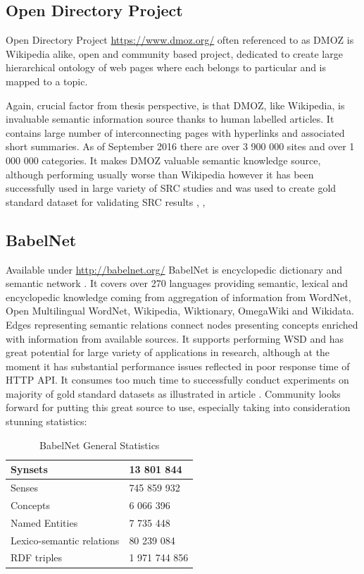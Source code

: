\documentclass[a4paper, 12pt, oneside]{Thesis} %
\begin{document}
\subsection{Open Directory Project} Open Directory Project \url{https://www.dmoz.org/} often referenced to as DMOZ is Wikipedia alike, open and community based project, dedicated to create large hierarchical ontology of web pages where each belongs to particular and is mapped to a topic. 

Again, crucial factor from thesis perspective, is that DMOZ, like Wikipedia, is invaluable semantic information source thanks to human labelled articles. It contains large number of interconnecting pages with hyperlinks and associated short summaries. As of September 2016 there are over 3 900 000 sites and over 1 000 000 categories. It makes DMOZ valuable semantic knowledge source, although performing usually worse than Wikipedia \cite{witten2008effective} however it has been successfully used in large variety of SRC studies and was used to create gold standard dataset for validating SRC results \cite{carpineto2010new}, \cite{geraci2006scalable}, \cite{osinski2004conceptual} 

\subsection{BabelNet} Available under \url{http://babelnet.org/} BabelNet is encyclopedic dictionary and semantic network \cite{navigli2012babelnet}. It covers over 270 languages providing semantic, lexical and encyclopedic knowledge coming from aggregation of information from WordNet, Open Multilingual WordNet, Wikipedia, Wiktionary, OmegaWiki and Wikidata. Edges representing semantic relations connect nodes presenting concepts enriched with information from available sources. It supports performing WSD and has great potential for large variety of applications in research, although at the moment it has substantial performance issues reflected in poor response time of HTTP API. It consumes too much time to successfully conduct experiments on majority of gold standard datasets as illustrated in article \cite{kozlowskiweb}. Community looks forward for putting this great source to use, especially taking into consideration stunning statistics:

\begin{table}[th]
\centering
 \begin{tabular}{| l | l | }
 \hline
Synsets & 13 801 844\\ \hline
Senses & 745 859 932 \\ \hline
Concepts & 6 066 396 \\ \hline
Named Entities & 7 735 448 \\ \hline
Lexico-semantic relations & 80 239 084 \\ \hline
RDF triples & 1 971 744 856 \\ 
 \hline
 \end{tabular}
\caption{BabelNet General Statistics}
\label{tab:babelstat}
\end{table}
\end{document}
